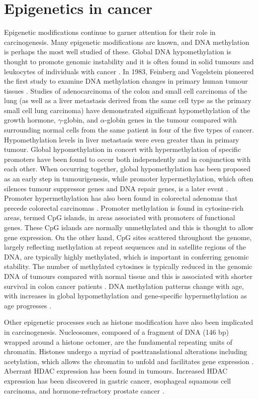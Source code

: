 \section[]{Epigenetics in cancer} %
\noindent Epigenetic modifications continue to garner attention for their role in carcinogenesis. Many epigenetic modifications are known, and DNA methylation is perhaps the most well studied of these. Global DNA hypomethylation is thought to promote genomic instability and it is often found in solid tumours \cite{c215} and leukocytes of individuals with cancer \cite{c216,c217}. In 1983, Feinberg and Vogelstein pioneered the first study to examine DNA methylation changes in primary human tumour tissues \cite{c215}. Studies of adenocarcinoma of the colon and small cell carcinoma of the lung (as well as a liver metastasis derived from the same cell type as the primary small cell lung carcinoma) have demonstrated significant hypomethylation of the growth hormone, $\gamma$-globin, and $\alpha$-globin genes in the tumour compared with surrounding normal cells from the same patient in four of the five types of cancer. Hypomethylation levels in liver metastasis were even greater than in primary tumour. Global hypomethylation in concert with hypermethylation of specific promoters have been found to occur both independently and in conjunction with each other. When occurring together, global hypomethylation has been proposed as an early step in tumourigenesis, while promoter hypermethylation, which often silences tumour suppressor genes and DNA repair genes, is a later event \cite{c218}. Promoter hypermethylation has also been found in colorectal adenomas that precede colorectal carcinomas \cite{c219}. Promoter methylation is found in cytosine-rich areas, termed CpG islands, in areas associated with promoters of functional genes. These CpG islands are normally unmethylated and this is thought to allow gene expression. On the other hand, CpG sites scattered throughout the genome, largely reflecting methylation at repeat sequences and in satellite regions of the DNA, are typically highly methylated, which is important in conferring genomic stability. The number of methylated cytosines is typically reduced in the genomic DNA of tumours compared with normal tissue \cite{c220} and this is associated with shorter survival in colon cancer patients \cite{c221}. DNA methylation patterns change with age, with increases in global hypomethylation and gene-specific hypermethylation as age progresses \cite{c222,c223}.

\noindent Other epigenetic processes such as histone modification have also been implicated in carcinogenesis. Nucleosomes, composed of a fragment of DNA (146 bp) wrapped around a histone octomer, are the fundamental repeating units of chromatin. Histones undergo a myriad of posttranslational alterations including acetylation, which allows the chromatin to unfold and facilitates gene expression \cite{c224}. Aberrant HDAC expression has been found in tumours. Increased HDAC expression has been discovered in gastric cancer, esophageal squamous cell carcinoma, and hormone-refractory prostate cancer \cite{c225,c226}.

